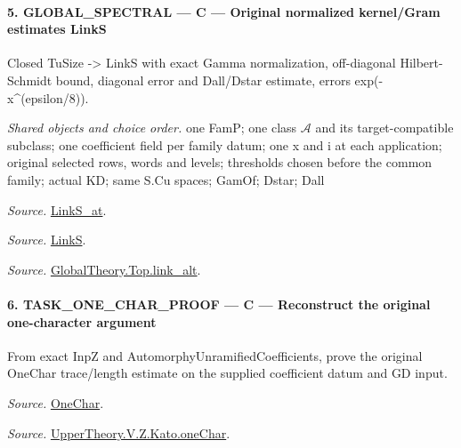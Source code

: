 \paragraph{5. GLOBAL\_\allowbreak SPECTRAL — C — Original normalized kernel/Gram estimates LinkS}

Closed TuSize -> LinkS with exact Gamma normalization, off-diagonal Hilbert-Schmidt bound, diagonal error and Dall/Dstar estimate, errors exp(-x\textasciicircum{}(epsilon/8)).

\emph{Shared objects and choice order.} one FamP; one class $\mathcal A$ and its target-compatible subclass; one coefficient field per family datum; one x and i at each application; original selected rows, words and levels; thresholds chosen before the common family; actual KD; same S.Cu spaces; GamOf; Dstar; Dall

\emph{Source.} \href{https://github.com/CocoSgt/riemann-hypothesis-lean/blob/7cbf7a0c32fca1badf05931879a37c3f8a2b03b4/src/Formalism/SharpRestriction/GlobalTheoremInputs.lean#L145-L149}{LinkS\_\allowbreak at}.

\emph{Source.} \href{https://github.com/CocoSgt/riemann-hypothesis-lean/blob/7cbf7a0c32fca1badf05931879a37c3f8a2b03b4/src/Formalism/SharpRestriction/GlobalTheoremInputs.lean#L152-L157}{LinkS}.

\emph{Source.} \href{https://github.com/CocoSgt/riemann-hypothesis-lean/blob/7cbf7a0c32fca1badf05931879a37c3f8a2b03b4/src/Development/AbelianVarietyTheory/Proofs/GlobalInterpolation/LinkAlt.lean#L16-L50}{GlobalTheory.Top.link\_\allowbreak alt}.



\paragraph{6. TASK\_\allowbreak ONE\_\allowbreak CHAR\_\allowbreak PROOF — C — Reconstruct the original one-character argument}

From exact InpZ and AutomorphyUnramifiedCoefficients, prove the original OneChar trace/length estimate on the supplied coefficient datum and GD input.

\emph{Source.} \href{https://github.com/CocoSgt/riemann-hypothesis-lean/blob/7cbf7a0c32fca1badf05931879a37c3f8a2b03b4/src/Development/AutomorphicArithmetic/AutomorphicVarieties/UnitaryThreeGroups/KatoUse.lean#L54-L64}{OneChar}.

\emph{Source.} \href{https://github.com/CocoSgt/riemann-hypothesis-lean/blob/7cbf7a0c32fca1badf05931879a37c3f8a2b03b4/src/Development/AutomorphicArithmetic/AutomorphicVarieties/ModularityArgument/KatoQuadraticCharacters/OneChar.lean#L158-L178}{UpperTheory.V.Z.Kato.oneChar}.



